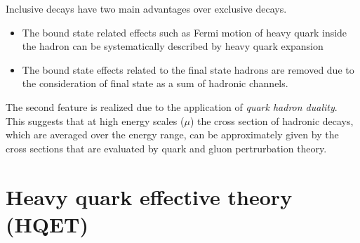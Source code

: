Inclusive decays have two main advantages over exclusive decays. 
\begin{itemize}
\item The bound state related effects such as Fermi motion \cite{Neubert:1993ch} of heavy quark inside the hadron can be systematically described by heavy quark expansion
\item The bound state effects related to the final state hadrons are removed due to the consideration of final state as a sum of hadronic channels. 
\end{itemize}
The second feature is realized due to the application of \textit{quark hadron duality}\cite{Poggio:1975af, Shifman:2000jv}. This suggests that at high energy scales ($\mu$) the cross section of hadronic decays, which are averaged over the energy range, can be approximately given by the cross sections that are evaluated by quark and gluon pertrurbation theory. 

\section{Heavy quark effective theory (HQET)}\label{sec:HQET}
